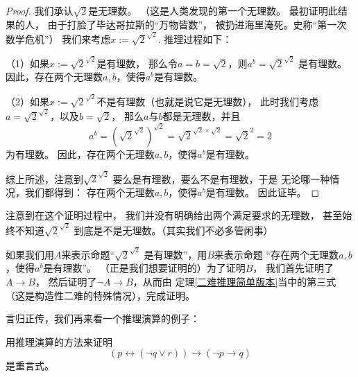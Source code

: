 \begin{proof}
我们承认$\sqrt{2}$是无理数。
（这是人类发现的第一个无理数。
最初证明此结果的人，
由于打脸了毕达哥拉斯的“万物皆数”，
被扔进海里淹死。史称“第一次数学危机”）
我们来考虑$x:=\sqrt{2}^{\sqrt{2}}$.
推理过程如下：

（1）如果$x:=\sqrt{2}^{\sqrt{2}}$是有理数，
那么令$a=b=\sqrt{2}$，则$a^b=\sqrt{2}^{\sqrt{2}}$
是有理数。因此，存在两个无理数$a,b$，使得$a^b$是有理数。

（2）如果$x:=\sqrt{2}^{\sqrt{2}}$不是有理数（也就是说它是无理数），
此时我们考虑$a=\sqrt{2}^{\sqrt{2}}$，以及$b=\sqrt{2}$，
那么$a$与$b$都是无理数，并且
$$a^b=(\sqrt{2}^{\sqrt{2}})^{\sqrt{2}}
=\sqrt{2}^{\sqrt{2}\times\sqrt{2}}
=\sqrt{2}^2=2$$
为有理数。
因此，存在两个无理数$a,b$，使得$a^b$是有理数。

综上所述，注意到$\sqrt{2}^{\sqrt{2}}$
要么是有理数，要么不是有理数，于是
无论哪一种情况，我们都得到：
存在两个无理数$a,b$，使得$a^b$是有理数。
因此证毕。
\end{proof}

注意到在这个证明过程中，
我们并没有明确给出两个满足要求的无理数，
甚至始终不知道$\sqrt{2}^{\sqrt{2}}$
到底是不是无理数。（其实我们不必多管闲事）

如果我们用$A$来表示命题“$\sqrt{2}^{\sqrt{2}}$
是有理数”，用$B$来表示命题
“存在两个无理数$a,b$，使得$a^b$是有理数”。
（正是我们想要证明的）为了证明$B$，
我们首先证明了$A\rightarrow B$，
然后证明了$\neg A\rightarrow B$，从而由
定理\ref{二难推理简单版本}当中的第三式
（这是构造性二难的特殊情况），完成证明。\vs

言归正传，我们再来看一个推理演算的例子：

\begin{example}
用推理演算的方法来证明
$$(p\leftrightarrow(\neg q\vee r))\rightarrow
(\neg p\rightarrow q)$$
是重言式。
\end{example}

